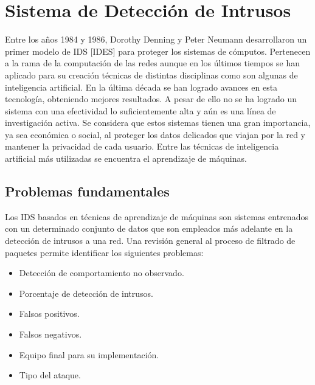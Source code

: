 \chapter{Sistema de Detección de Intrusos}\label{chapter:ids}

Entre los años 1984 y 1986, Dorothy Denning y Peter Neumann desarrollaron un primer modelo de IDS [IDES] para proteger los sistemas de cómputos. Pertenecen a la rama de la computación de las redes aunque en los últimos tiempos se han aplicado para su creación técnicas de distintas disciplinas como son algunas de inteligencia artificial. En la última década se han logrado avances en esta tecnología, obteniendo mejores resultados. A pesar de ello no se ha logrado un sistema con una efectividad lo suficientemente alta y aún es una línea de investigación activa. Se considera que estos sistemas tienen una gran importancia, ya sea económica o social, al proteger los datos delicados que viajan por la red y mantener la privacidad de cada usuario. Entre las técnicas de inteligencia artificial más utilizadas se encuentra el aprendizaje de máquinas.

\section{Problemas fundamentales}
Los IDS basados en técnicas de aprendizaje de máquinas son sistemas entrenados con un determinado conjunto de datos que son empleados más adelante en la detección de intrusos a una red. Una revisión general al proceso de filtrado de paquetes permite identificar los siguientes problemas:
\begin{itemize}
    \item Detección de comportamiento no observado.
    \item Porcentaje de detección de intrusos.
    \item Falsos positivos.
    \item Falsos negativos.
    \item Equipo final para su implementación.
    \item Tipo del ataque.
\end{itemize}

